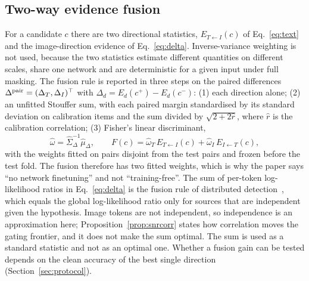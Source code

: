 \subsection{Two-way evidence fusion}\label{ssec:fusion}
For a candidate $c$ there are two directional statistics, $E_{T\leftarrow I}(c)$ of Eq.~\eqref{eq:text} and the image-direction
evidence of Eq.~\eqref{eq:delta}.
Inverse-variance weighting is not used, because the two statistics estimate different quantities on different scales, share
one network and are deterministic for a given input under full masking.
The fusion rule is reported in three steps on the paired differences $\Delta^{\rm pair}=(\Delta_T,\Delta_I)^\top$ with
$\Delta_d=E_d(c^+)-E_d(c^-)$:
(1) each direction alone;
(2) an unfitted Stouffer sum, with each paired margin standardised by its standard deviation on calibration items and the sum
divided by $\sqrt{2+2\hat r}$, where $\hat r$ is the calibration correlation;
(3) Fisher's linear discriminant,
\begin{equation}
\hat\omega=\hat\Sigma_{\Delta}^{-1}\hat\mu_{\Delta},\qquad F(c)=\hat\omega_T\,E_{T\leftarrow I}(c)+\hat\omega_I\,E_{I\leftarrow T}(c),
\label{eq:lda}
\end{equation}
with the weights fitted on pairs disjoint from the test pairs and frozen before the test fold.
The fusion therefore has two fitted weights, which is why the paper says ``no network finetuning'' and not ``training-free''.
The sum of per-token log-likelihood ratios in Eq.~\eqref{eq:delta} is the fusion rule of distributed detection~\citep{chair1986optimal}, which
equals the global log-likelihood ratio only for sources that are independent given the hypothesis.
Image tokens are not independent, so independence is an approximation here; Proposition~\ref{prop:snrcorr} states how correlation
moves the gating frontier, and it does not make the sum optimal.
The sum is used as a standard statistic and not as an optimal one.
Whether a fusion gain can be tested depends on the clean accuracy of the best single direction (Section~\ref{sec:protocol}).


